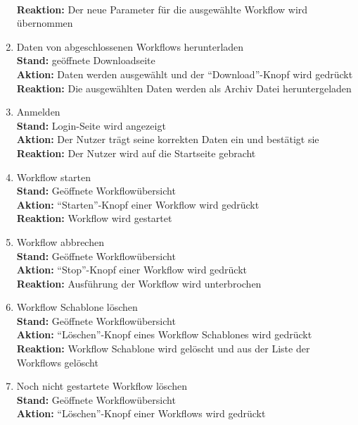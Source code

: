 \begin{enumerate}
        \\ \textbf{Reaktion:} Der neue Parameter für die ausgewählte \gls{Workflow} wird übernommen
    \item Daten von abgeschlossenen \glspl{Workflow} herunterladen
        \\ \textbf{Stand:} geöffnete Downloadseite
        \\ \textbf{Aktion:} Daten werden ausgewählt und der \enquote{Download}-Knopf wird gedrückt
        \\ \textbf{Reaktion:} Die ausgewählten Daten werden als Archiv Datei heruntergeladen
    \item Anmelden
        \\ \textbf{Stand:} Login-Seite wird angezeigt
        \\ \textbf{Aktion:} Der \gls{Nutzer} trägt seine korrekten Daten ein und bestätigt sie
        \\ \textbf{Reaktion:} Der \gls{Nutzer} wird auf die Startseite gebracht
    \item \gls{Workflow} starten
        \\ \textbf{Stand:} Geöffnete Workflowübersicht 
        \\ \textbf{Aktion:} \enquote{Starten}-Knopf einer \gls{Workflow} wird gedrückt
        \\ \textbf{Reaktion:} \gls{Workflow} wird gestartet
    \item \gls{Workflow} abbrechen
        \\ \textbf{Stand:} Geöffnete Workflowübersicht
        \\ \textbf{Aktion:} \enquote{Stop}-Knopf einer \gls{Workflow} wird gedrückt
        \\ \textbf{Reaktion:} Ausführung der \gls{Workflow} wird unterbrochen
    \item \gls{Workflow Schablone} löschen
        \\ \textbf{Stand:} Geöffnete Workflowübersicht
        \\ \textbf{Aktion:} \enquote{Löschen}-Knopf eines \glspl{Workflow Schablone} wird gedrückt
        \\ \textbf{Reaktion:} \gls{Workflow Schablone} wird gelöscht und aus der Liste der Workflows gelöscht
    \item Noch nicht gestartete \gls{Workflow} löschen
        \\ \textbf{Stand:} Geöffnete Workflowübersicht
        \\ \textbf{Aktion:} \enquote{Löschen}-Knopf einer \glspl{Workflow} wird gedrückt

\end{enumerate}
